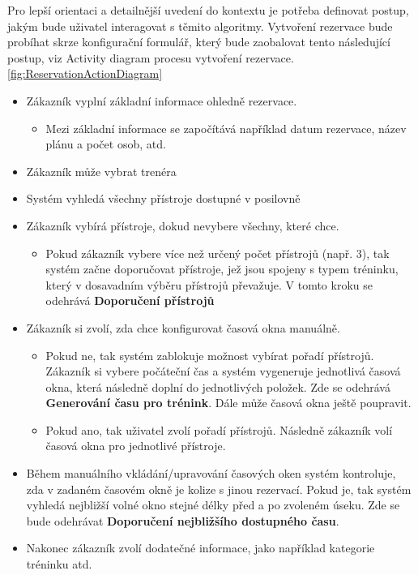 Pro lepší orientaci a detailnější uvedení do kontextu je potřeba definovat postup, jakým bude uživatel interagovat s těmito algoritmy. Vytvoření rezervace bude probíhat skrze konfigurační formulář, který bude zaobalovat tento následující postup, viz Activity diagram procesu vytvoření rezervace. \ref{fig:ReservationActionDiagram}
\begin{itemize}
  \item Zákazník vyplní základní informace ohledně rezervace.
    \begin{itemize}
      \item Mezi základní informace se započítává například datum rezervace, název plánu a počet osob, atd.
    \end{itemize}
  \item Zákazník může vybrat trenéra
  \item Systém vyhledá všechny přístroje dostupné v posilovně
  \item Zákazník vybírá přístroje, dokud nevybere všechny, které chce.
    \begin{itemize}
        \item Pokud zákazník vybere více než určený počet přístrojů (např. 3), tak systém začne doporučovat přístroje, jež jsou spojeny s typem tréninku, který v dosavadním výběru přístrojů převažuje. V tomto kroku se odehrává \textbf{Doporučení přístrojů}
    \end{itemize}
  \item Zákazník si zvolí, zda chce konfigurovat časová okna manuálně.
      \begin{itemize}
        \item Pokud ne, tak systém zablokuje možnost vybírat pořadí přístrojů. Zákazník si vybere počáteční čas a systém vygeneruje jednotlivá časová okna, která následně doplní do jednotlivých položek. Zde se odehrává \textbf{Generování času pro trénink}. Dále může časová okna ještě poupravit. 
        \item Pokud ano, tak uživatel zvolí pořadí přístrojů. Následně zákazník volí časová okna pro jednotlivé přístroje. 
    \end{itemize}
    
  \item Během manuálního vkládání/upravování časových oken systém kontroluje, zda v zadaném časovém okně je kolize s jinou rezervací. Pokud je, tak systém vyhledá nejbližší volné okno stejné délky před a po zvoleném úseku. Zde se bude odehrávat \textbf{Doporučení nejbližšího dostupného času}.
  \item Nakonec zákazník zvolí dodatečné informace, jako například kategorie tréninku atd.
\end{itemize}


